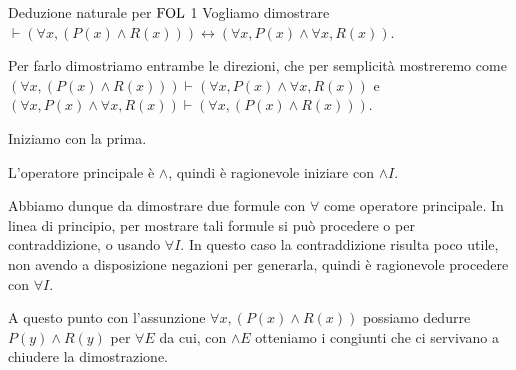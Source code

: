\begin{example}{Deduzione naturale per \(\FOL\) 1}
  Vogliamo dimostrare \(\vdash (\forall x, (P(x) \land R(x)))\leftrightarrow (\forall x, P(x) \land \forall x, R(x))\).

  Per farlo dimostriamo entrambe le direzioni, che per semplicità mostreremo come \((\forall x, (P(x) \land R(x)))\vdash (\forall x, P(x) \land \forall x, R(x))\) e \((\forall x, P(x) \land \forall x, R(x))\vdash (\forall x, (P(x) \land R(x)))\).

  Iniziamo con la prima.

  L'operatore principale è \(\land\), quindi è ragionevole iniziare con \(\land I\).

  \begin{prooftree}
  \end{prooftree}

  Abbiamo dunque da dimostrare due formule con \(\forall\) come operatore principale. In linea di principio, per mostrare tali formule si può procedere o per contraddizione, o usando \(\forall I\). In questo caso la contraddizione risulta poco utile, non avendo a disposizione negazioni per generarla, quindi è ragionevole procedere con \(\forall I\).
  
  \begin{prooftree}
  \end{prooftree}

  A questo punto con l'assunzione \(\forall x, (P(x) \land R(x))\) possiamo dedurre \(P(y) \land R(y)\) per \(\forall E\) da cui, con \(\land E\) otteniamo i congiunti che ci servivano a chiudere la dimostrazione.

   \begin{prooftree}

  \end{prooftree}


\end{example}
